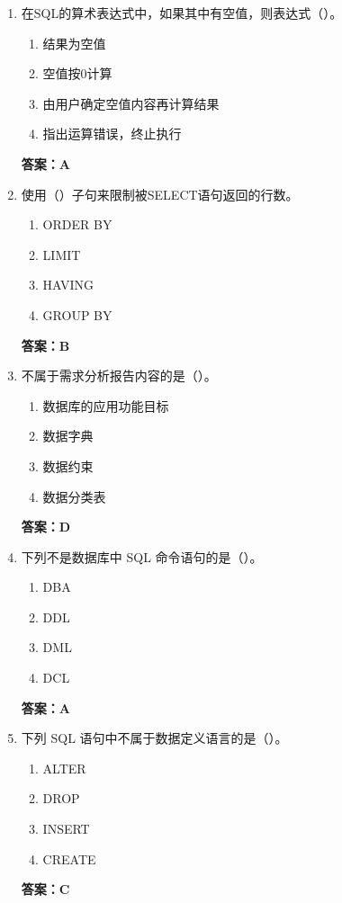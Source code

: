 \documentclass[12pt, a4paper]{article}
\begin{document}
\begin{enumerate}[label=\arabic*.]
	\item 在SQL的算术表达式中，如果其中有空值，则表达式（\quad）。
	      \begin{enumerate}
		      \item 结果为空值
		      \item 空值按0计算
		      \item 由用户确定空值内容再计算结果
		      \item 指出运算错误，终止执行
	      \end{enumerate}
	      \textbf{答案：A}

	\item 使用（\quad）子句来限制被SELECT语句返回的行数。
	      \begin{enumerate}
		      \item ORDER BY
		      \item LIMIT
		      \item HAVING
		      \item GROUP BY
	      \end{enumerate}
	      \textbf{答案：B}

	\item 不属于需求分析报告内容的是（\quad）。
	      \begin{enumerate}
		      \item 数据库的应用功能目标
		      \item 数据字典
		      \item 数据约束
		      \item 数据分类表
	      \end{enumerate}
	      \textbf{答案：D}

	\item 下列不是数据库中 SQL 命令语句的是（\quad）。
	      \begin{enumerate}
		      \item DBA
		      \item DDL
		      \item DML
		      \item DCL
	      \end{enumerate}
	      \textbf{答案：A}

	\item 下列 SQL 语句中不属于数据定义语言的是（\quad）。
	      \begin{enumerate}
		      \item ALTER
		      \item DROP
		      \item INSERT
		      \item CREATE
	      \end{enumerate}
	      \textbf{答案：C}


\end{enumerate}
\end{document}
